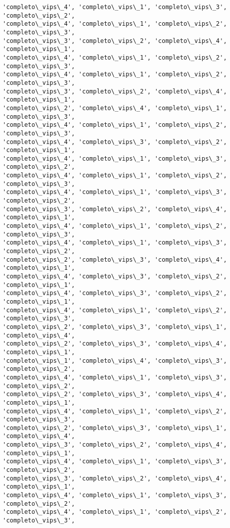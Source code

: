 \documentclass[11pt]{article}
\begin{document}
\begin{Verbatim}[commandchars=\\\{\}]
'completo\_vips\_4', 'completo\_vips\_1', 'completo\_vips\_3', 'completo\_vips\_2',
'completo\_vips\_4', 'completo\_vips\_1', 'completo\_vips\_2', 'completo\_vips\_3',
'completo\_vips\_3', 'completo\_vips\_2', 'completo\_vips\_4', 'completo\_vips\_1',
'completo\_vips\_4', 'completo\_vips\_1', 'completo\_vips\_2', 'completo\_vips\_3',
'completo\_vips\_4', 'completo\_vips\_1', 'completo\_vips\_2', 'completo\_vips\_3',
'completo\_vips\_3', 'completo\_vips\_2', 'completo\_vips\_4', 'completo\_vips\_1',
'completo\_vips\_2', 'completo\_vips\_4', 'completo\_vips\_1', 'completo\_vips\_3',
'completo\_vips\_4', 'completo\_vips\_1', 'completo\_vips\_2', 'completo\_vips\_3',
'completo\_vips\_4', 'completo\_vips\_3', 'completo\_vips\_2', 'completo\_vips\_1',
'completo\_vips\_4', 'completo\_vips\_1', 'completo\_vips\_3', 'completo\_vips\_2',
'completo\_vips\_4', 'completo\_vips\_1', 'completo\_vips\_2', 'completo\_vips\_3',
'completo\_vips\_4', 'completo\_vips\_1', 'completo\_vips\_3', 'completo\_vips\_2',
'completo\_vips\_3', 'completo\_vips\_2', 'completo\_vips\_4', 'completo\_vips\_1',
'completo\_vips\_4', 'completo\_vips\_1', 'completo\_vips\_2', 'completo\_vips\_3',
'completo\_vips\_4', 'completo\_vips\_1', 'completo\_vips\_3', 'completo\_vips\_2',
'completo\_vips\_2', 'completo\_vips\_3', 'completo\_vips\_4', 'completo\_vips\_1',
'completo\_vips\_4', 'completo\_vips\_3', 'completo\_vips\_2', 'completo\_vips\_1',
'completo\_vips\_4', 'completo\_vips\_3', 'completo\_vips\_2', 'completo\_vips\_1',
'completo\_vips\_4', 'completo\_vips\_1', 'completo\_vips\_2', 'completo\_vips\_3',
'completo\_vips\_2', 'completo\_vips\_3', 'completo\_vips\_1', 'completo\_vips\_4',
'completo\_vips\_2', 'completo\_vips\_3', 'completo\_vips\_4', 'completo\_vips\_1',
'completo\_vips\_1', 'completo\_vips\_4', 'completo\_vips\_3', 'completo\_vips\_2',
'completo\_vips\_4', 'completo\_vips\_1', 'completo\_vips\_3', 'completo\_vips\_2',
'completo\_vips\_2', 'completo\_vips\_3', 'completo\_vips\_4', 'completo\_vips\_1',
'completo\_vips\_4', 'completo\_vips\_1', 'completo\_vips\_2', 'completo\_vips\_3',
'completo\_vips\_2', 'completo\_vips\_3', 'completo\_vips\_1', 'completo\_vips\_4',
'completo\_vips\_3', 'completo\_vips\_2', 'completo\_vips\_4', 'completo\_vips\_1',
'completo\_vips\_4', 'completo\_vips\_1', 'completo\_vips\_3', 'completo\_vips\_2',
'completo\_vips\_3', 'completo\_vips\_2', 'completo\_vips\_4', 'completo\_vips\_1',
'completo\_vips\_4', 'completo\_vips\_1', 'completo\_vips\_3', 'completo\_vips\_2',
'completo\_vips\_4', 'completo\_vips\_1', 'completo\_vips\_2', 'completo\_vips\_3',

\end{Verbatim}
\end{document}
